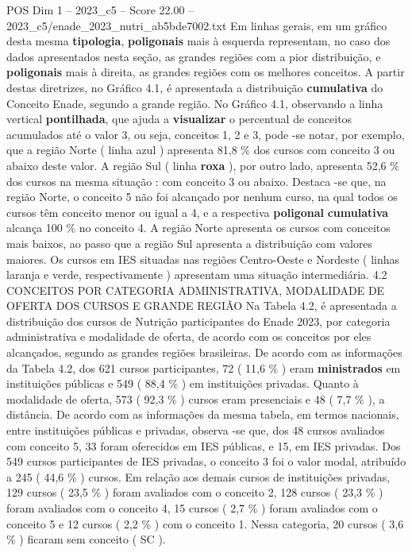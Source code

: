 \begin{textsample}{POS Dim 1 – 2023\_c5 – Score 22.00 – 2023\_c5/enade\_2023\_nutri\_ab5bde7002.txt}
Em linhas gerais, em um gráfico desta mesma \textbf{tipologia}, \textbf{poligonais} mais à esquerda representam, no caso dos dados apresentados nesta seção, as grandes regiões com a pior distribuição, e \textbf{poligonais} mais à direita, as grandes regiões com os melhores conceitos.
A partir destas diretrizes, no Gráfico 4.1, é apresentada a distribuição \textbf{cumulativa} do Conceito Enade, segundo a grande região.
No Gráfico 4.1, observando a linha vertical \textbf{pontilhada}, que ajuda a \textbf{visualizar} o percentual de conceitos acumulados até o valor 3, ou seja, conceitos 1, 2 e 3, pode -se notar, por exemplo, que a região Norte ( linha azul ) apresenta 81,8 \% dos cursos com conceito 3 ou abaixo deste valor.
A região Sul ( linha \textbf{roxa} ), por outro lado, apresenta 52,6 \% dos cursos na mesma situação : com conceito 3 ou abaixo.
Destaca -se que, na região Norte, o conceito 5 não foi alcançado por nenhum curso, na qual todos os cursos têm conceito menor ou igual a 4, e a respectiva \textbf{poligonal} \textbf{cumulativa} alcança 100 \% no conceito 4.
A região Norte apresenta os cursos com conceitos mais baixos, ao passo que a região Sul apresenta a distribuição com valores maiores.
Os cursos em IES situadas nas regiões Centro-Oeste e Nordeste ( linhas laranja e verde, respectivamente ) apresentam uma situação intermediária. 4.2 CONCEITOS POR CATEGORIA ADMINISTRATIVA, MODALIDADE DE OFERTA DOS CURSOS E GRANDE REGIÃO Na Tabela 4.2, é apresentada a distribuição dos cursos de Nutrição participantes do Enade 2023, por categoria administrativa e modalidade de oferta, de acordo com os conceitos por eles alcançados, segundo as grandes regiões brasileiras.
De acordo com as informações da Tabela 4.2, dos 621 cursos participantes, 72 ( 11,6 \% ) eram \textbf{ministrados} em instituições públicas e 549 ( 88,4 \% ) em instituições privadas.
Quanto à modalidade de oferta, 573 ( 92,3 \% ) cursos eram presenciais e 48 ( 7,7 \% ), a distância.
De acordo com as informações da mesma tabela, em termos nacionais, entre instituições públicas e privadas, observa -se que, dos 48 cursos avaliados com conceito 5, 33 foram oferecidos em IES públicas, e 15, em IES privadas.
Dos 549 cursos participantes de IES privadas, o conceito 3 foi o valor modal, atribuído a 245 ( 44,6 \% ) cursos.
Em relação aos demais cursos de instituições privadas, 129 cursos ( 23,5 \% ) foram avaliados com o conceito 2, 128 cursos ( 23,3 \% ) foram avaliados com o conceito 4, 15 cursos ( 2,7 \% ) foram avaliados com o conceito 5 e 12 cursos ( 2,2 \% ) com o conceito 1.
Nessa categoria, 20 cursos ( 3,6 \% ) ficaram sem conceito ( SC ).

\end{textsample}
